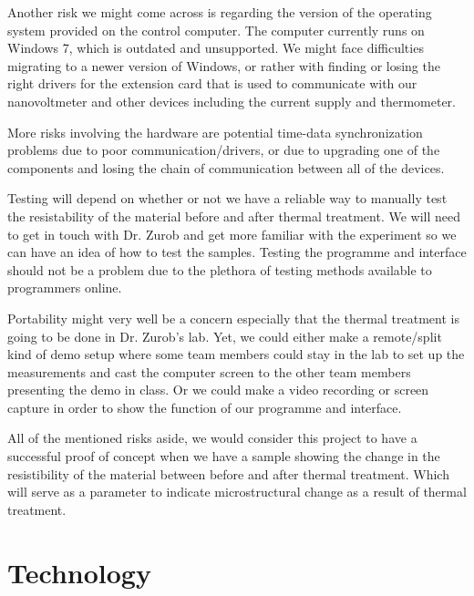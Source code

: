\documentclass{article}
\begin{document}
Another risk we might come across is regarding the version of the operating system provided on the control computer. The computer currently runs on Windows 7, which is outdated and unsupported. We might face difficulties migrating to a newer version of Windows, or rather with finding or losing the right drivers for the extension card that is used to communicate with our nanovoltmeter and other devices including the current supply and thermometer. 

More risks involving the hardware are potential time-data synchronization problems due to poor communication/drivers, or due to upgrading one of the components and losing the chain of communication between all of the devices. 

Testing will depend on whether or not we have a reliable way to manually test the resistability of the material before and after thermal treatment. We will need to get in touch with Dr. Zurob and get more familiar with the experiment so we can have an idea of how to test the samples. Testing the programme and interface should not be a problem due to the plethora of testing methods available to programmers online. 

Portability might very well be a concern especially that the thermal treatment is going to be done in Dr. Zurob's lab. Yet, we could either make a remote/split kind of demo setup where some team members could stay in the lab to set up the measurements and cast the computer screen to the other team members presenting the demo in class. Or we could make a video recording or screen capture in order to show the function of our programme and interface. 

All of the mentioned risks aside, we would consider this project to have a successful proof of concept when we have a sample showing the change in the resistibility of the material between before and after thermal treatment. Which will serve as a parameter to indicate microstructural change as a result of thermal treatment.

\section{Technology}
\end{document}
